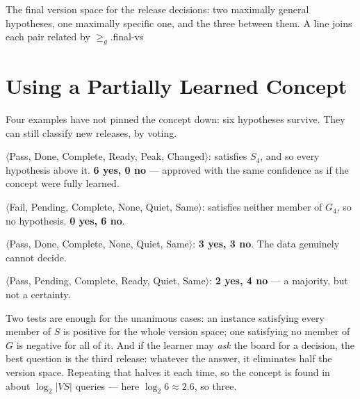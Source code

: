 %
{The final version space for the release decisions: two maximally general hypotheses,
one maximally specific one, and the three between them. A line joins each pair related
by $\ge_g$.}{final-vs}

\section{Using a Partially Learned Concept}

Four examples have not pinned the concept down: six hypotheses survive. They can
still classify new releases, by voting.

\begin{worked}
\begin{tight}
  \item $\langle$Pass, Done, Complete, Ready, Peak, Changed$\rangle$: satisfies $S_4$,
        and so every hypothesis above it. \textbf{6 yes, 0 no} --- approved with
        the same confidence as if the concept were fully learned.
  \item $\langle$Fail, Pending, Complete, None, Quiet, Same$\rangle$: satisfies
        neither member of $G_4$, so no hypothesis. \textbf{0 yes, 6 no}.
  \item $\langle$Pass, Done, Complete, None, Quiet, Same$\rangle$: \textbf{3 yes,
        3 no}. The data genuinely cannot decide.
  \item $\langle$Pass, Pending, Complete, Ready, Quiet, Same$\rangle$: \textbf{2 yes,
        4 no} --- a majority, but not a certainty.
\end{tight}
\smallskip
Two tests are enough for the unanimous cases: an instance satisfying every
member of $S$ is positive for the whole version space; one satisfying no member
of $G$ is negative for all of it. And if the learner may \emph{ask} the board for a
decision, the best question is the third release: whatever the answer, it
eliminates half the version space. Repeating that halves it each time, so the
concept is found in about $\log_2 |VS|$ queries --- here $\log_2 6 \approx 2.6$,
so three.
\end{worked}

